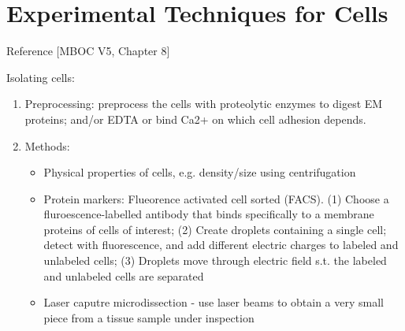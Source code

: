 \documentclass{report}
\begin{document}
\section{Experimental Techniques for Cells} 

Reference [MBOC V5, Chapter 8]

Isolating cells: 
\begin{enumerate}
\item Preprocessing: preprocess the cells with proteolytic enzymes to digest EM proteins; and/or EDTA or bind Ca2+ on which cell adhesion depends.

\item Methods: 
\begin{itemize}
\item Physical properties of cells, e.g. density/size using centrifugation
\item Protein markers: Flueorence activated cell sorted (FACS). (1) Choose a fluroescence-labelled antibody that binds specifically to a membrane proteins of cells of interest; (2) Create droplets containing a single cell; detect with fluorescence, and add different electric charges to labeled and unlabeled cells; (3) Droplets move through electric field s.t. the labeled and unlabeled cells are separated
\item Laser caputre microdissection - use laser beams to obtain a very small piece from a tissue sample under inspection
\end{itemize}
\end{enumerate}
\end{document}
